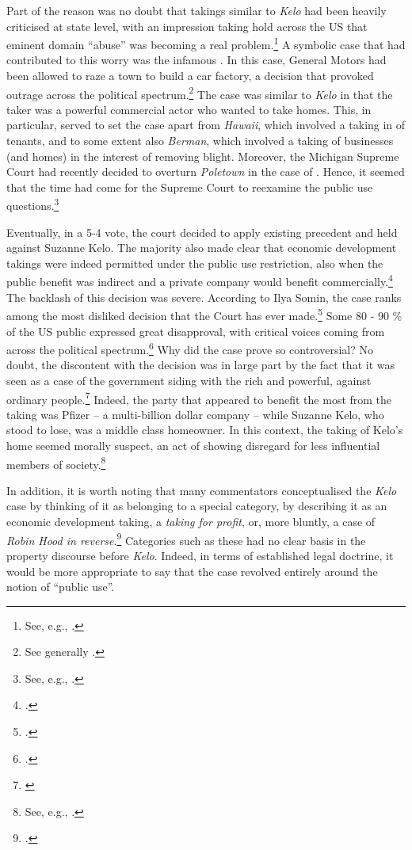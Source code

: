Part of the reason was no doubt that takings similar to {\it Kelo} had been heavily criticised at state level, with an impression taking hold across the US that eminent domain ``abuse'' was becoming a real problem.\footnote{See, e.g., \cite[667-669]{sandefur05}.} A symbolic case that had contributed to this worry was the infamous \textcite{poletown81}. In this case, General Motors had been allowed to raze a town to build a car factory, a decision that provoked outrage across the political spectrum.\footnote{See generally \cite{sandefur05}.} The case was similar to {\it Kelo} in that the taker was a powerful commercial actor who wanted to take homes. This, in particular, served to set the case apart from {\it Hawaii}, which involved a taking in  of tenants, and to some extent also {\it Berman}, which involved a taking of businesses (and homes) in the interest of removing blight. Moreover, the Michigan Supreme Court had recently decided to overturn {\it Poletown} in the case of \textcite{wayne04}. Hence, it seemed that the time had come for the Supreme Court to reexamine the public use questions.\footnote{See, e.g., \cite{sandefur05,claeys04}.}

Eventually, in a 5-4 vote, the court decided to apply existing precedent and held against Suzanne Kelo. The majority also made clear that economic development takings were indeed permitted under the public use restriction, also when the public benefit was indirect and a private company would benefit commercially.\footcite[469-470]{kelo05} The backlash of this decision was severe. According to Ilya Somin, the case ranks among the most disliked decision that the Court has ever made.\footcite[2]{somin11} Some 80 - 90 \% of the US public expressed great disapproval, with critical voices coming from across the political spectrum.\footcite[2108-2110]{somin09} Why did the case prove so controversial? No doubt, the discontent with the decision was  in large part by the fact that it was seen as a case of the government siding with the rich and powerful, against ordinary people.\footnote{\cite[630-634]{baron07}} Indeed, the party that appeared to benefit the most from the taking was Pfizer -- a multi-billion dollar company -- while Suzanne Kelo, who stood to lose, was a middle class homeowner. In this context, the taking of Kelo's home seemed morally suspect, an act of  showing disregard for less influential members of society.\footnote{See, e.g., \cite{underkuffler06}.}

In addition, it is worth noting that many commentators conceptualised the {\it Kelo} case by thinking of it as belonging to a special category, by describing it as an economic development taking, a {\it taking for profit}, or, more bluntly, a case of {\it Robin Hood in reverse}.\footcite{somin05} Categories such as these had no clear basis in the property discourse before {\it Kelo}. Indeed, in terms of established legal doctrine, it would be more appropriate to say that the case revolved entirely around the notion of ``public use''. 

